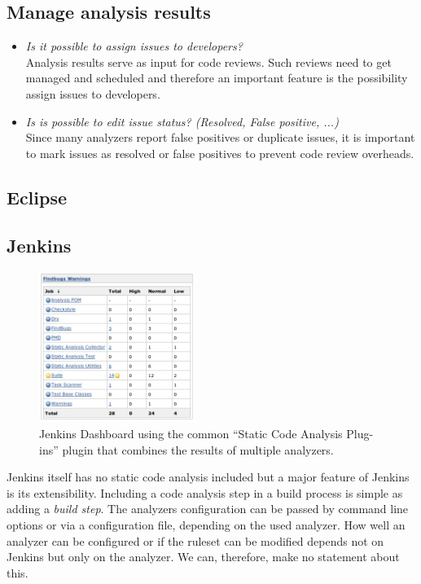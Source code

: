 \documentclass[conference]{IEEEtran}
\begin{document}
\subsection{Manage analysis results}
\begin{itemize}
	\item \textit{Is it possible to assign issues to developers?} \\
	Analysis results serve as input for code reviews. Such reviews need to get managed and scheduled and therefore an important feature is the possibility assign issues to developers.
	
	\item \textit{Is is possible to edit issue status? (Resolved, False positive, ...)} \\
	Since many analyzers report false positives or duplicate issues, it is important to mark issues as resolved or false positives to prevent code review overheads.
\end{itemize}



\subsection{Eclipse}
\label{subsec:evaluation_eclipse}

\subsection{Jenkins}
\label{subsec:evaluation_jenkins}

\begin{figure}[t]
	\centering
	\includegraphics[width=0.45\textwidth]{img/jenkins_dashboard.png}
	\caption{Jenkins Dashboard using the common ``Static Code Analysis Plug-ins'' plugin that combines the results of multiple analyzers.}
	\label{fig:jenkins-dashboard}
\end{figure}

Jenkins itself has no static code analysis included but a major feature of Jenkins is its extensibility. Including a code analysis step in a build process is simple as adding a \textit{build step}. The analyzers configuration can be passed by command line options or via a configuration file, depending on the used analyzer. How well an analyzer can be configured or if the ruleset can be modified depends not on Jenkins but only on the analyzer. We can, therefore, make no statement about this.
\end{document}
